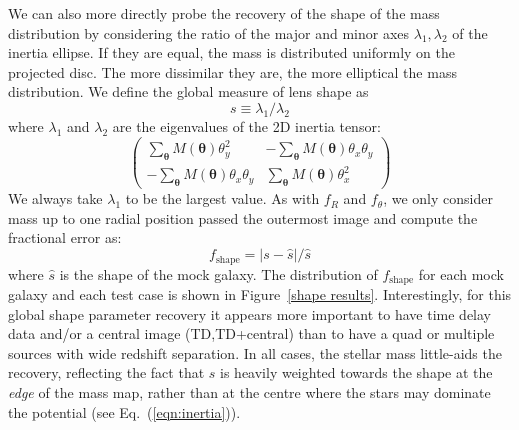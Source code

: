 \documentclass[galley,usenatbib]{mn2e}
\renewcommand{\vec}[1]{\ensuremath{\boldsymbol{#1}}}
\newcommand{\figref}[1] {Figure~\ref{#1}}
\newcommand{\eqnref}[1] {Eq.~(\ref{#1})}
\begin{document}
We can also more directly probe the recovery of the shape of the mass
distribution by considering the ratio of the major and minor axes $\lambda_1,
\lambda_2$ of the inertia ellipse. If they are equal, the mass is distributed
uniformly on the projected disc. The more dissimilar they are, the more
elliptical the mass distribution. We define the global measure of lens shape as
%
\begin{equation} 
    s \equiv \lambda_1/\lambda_2
\end{equation} 
%
where $\lambda_1$ and $\lambda_2$ are the eigenvalues of the 2D inertia tensor:
%
\begin{equation}
\left(
\begin{matrix}
   \sum_{\vec\theta} M(\vec\theta) \theta^2_y 
    & - \sum_{\vec\theta} M(\vec\theta) \theta_x \theta_y \\
    - \sum_{\vec\theta} M(\vec\theta) \theta_x \theta_y
    & \sum_{\vec\theta} M(\vec\theta) \theta^2_x
\end{matrix}
\right)
    \label{eqn:inertia}
\end{equation}
%
We always take $\lambda_1$ to be the largest value. As with $f_R$ and
$f_\theta$, we only consider mass up to one radial position passed the
outermost image and compute the fractional error as:
%
\begin{equation} \label{ferror shape}
  f_\mathrm{shape} = \left|s - \widehat s\right|  / \widehat s
\end{equation}
%
where $\widehat s$ is the shape of the mock galaxy. The distribution of
$f_\mathrm{shape}$ for each mock galaxy and each test case is shown in
\figref{shape results}.  Interestingly, for this global shape parameter
recovery it appears more important to have time delay data and/or a central
image (TD,TD+central) than to have a quad or multiple sources with wide redshift
separation. In all cases, the stellar mass little-aids the recovery, reflecting
the fact that $s$ is heavily weighted towards the shape at the {\it edge} of
the mass map, rather than at the centre where the stars may dominate the
potential (see \eqnref{eqn:inertia}).
\end{document}
